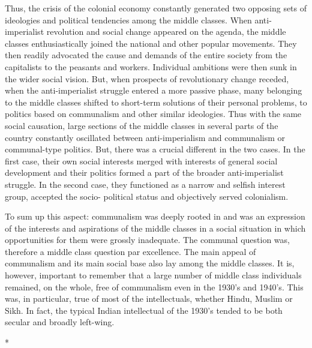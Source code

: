 \begin{multicols}{2}
Thus, the crisis of the colonial economy constantly generated two opposing sets of ideologies and political tendencies among the middle classes. When anti-imperialist revolution and social change appeared on the agenda, the middle classes enthusiastically joined the national and other popular movements. They then readily advocated the cause and demands of the entire society from the capitalists to the peasants and workers. Individual ambitions were then sunk in the wider social vision. But, when prospects of revolutionary change receded, when the anti-imperialist struggle entered a more passive phase, many belonging to the middle classes shifted to short-term solutions of their personal problems, to politics based on communalism and other similar ideologies. Thus with the same social causation, large sections of the middle classes in several parts of the country constantly oscillated between anti-imperialism and communalism or communal-type politics. But, there was a crucial different in the two cases. In the first case, their own social interests merged with interests of general social development and their politics formed a part of the broader anti-imperialist struggle. In the second case, they functioned as a narrow and selfish interest group, accepted the socio- political status and objectively served colonialism.

To sum up this aspect: communalism was deeply rooted in and was an expression of the interests and aspirations of the middle classes in a social situation in which opportunities for them were grossly inadequate. The communal question was, therefore a middle class question par excellence. The main appeal of communalism and its main social base also lay among the middle classes. It is, however, important to remember that a large number of middle class individuals remained, on the whole, free of communalism even in the 1930's and 1940's. This was, in particular, true of most of the intellectuals, whether Hindu, Muslim or Sikh. In fact, the typical Indian intellectual of the 1930's tended to be both secular and broadly left-wing.

\begin{center}*\end{center}


\end{multicols}
